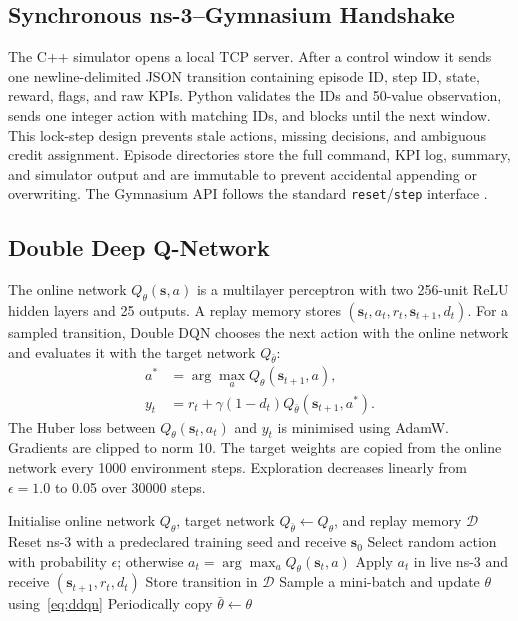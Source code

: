 \documentclass[10pt,conference]{IEEEtran}
\begin{document}
\subsection{Synchronous ns-3--Gymnasium Handshake}

The C++ simulator opens a local TCP server. After a control window it sends one
newline-delimited JSON transition containing episode ID, step ID, state,
reward, flags, and raw KPIs. Python validates the IDs and 50-value observation,
sends one integer action with matching IDs, and blocks until the next window.
This lock-step design prevents stale actions, missing decisions, and ambiguous
credit assignment. Episode directories store the full command, KPI log,
summary, and simulator output and are immutable to prevent accidental
appending or overwriting. The Gymnasium API follows the standard
\texttt{reset}/\texttt{step} interface \cite{towers2024}.

\subsection{Double Deep Q-Network}

The online network $Q_\theta(\mathbf s,a)$ is a multilayer perceptron with two
256-unit ReLU hidden layers and 25 outputs. A replay memory stores
$(\mathbf s_t,a_t,r_t,\mathbf s_{t+1},d_t)$. For a sampled transition, Double
DQN chooses the next action with the online network and evaluates it with the
target network $Q_{\bar\theta}$:
\begin{align}
a^*&=\arg\max_a Q_\theta(\mathbf s_{t+1},a),\\
y_t&=r_t+\gamma(1-d_t)Q_{\bar\theta}(\mathbf s_{t+1},a^*).
\label{eq:ddqn}
\end{align}
The Huber loss between $Q_\theta(\mathbf s_t,a_t)$ and $y_t$ is minimised using
AdamW. Gradients are clipped to norm 10. The target weights are copied from the
online network every 1000 environment steps. Exploration decreases linearly
from $\epsilon=1.0$ to 0.05 over 30000 steps.

\begin{algorithmic}[1]
\STATE Initialise online network $Q_\theta$, target network
$Q_{\bar\theta}\leftarrow Q_\theta$, and replay memory $\mathcal D$
  \STATE Reset ns-3 with a predeclared training seed and receive $\mathbf s_0$
    \STATE Select random action with probability $\epsilon$; otherwise
    $a_t=\arg\max_a Q_\theta(\mathbf s_t,a)$
    \STATE Apply $a_t$ in live ns-3 and receive $(\mathbf s_{t+1},r_t,d_t)$
    \STATE Store transition in $\mathcal D$
    \STATE Sample a mini-batch and update $\theta$ using~\eqref{eq:ddqn}
    \STATE Periodically copy $\bar\theta\leftarrow\theta$
  \ENDWHILE
\ENDFOR
\end{algorithmic}
\end{document}
